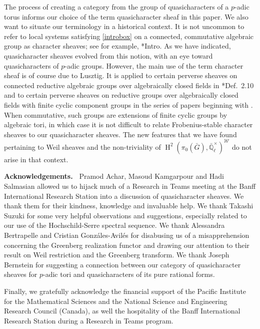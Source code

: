 \documentclass[10pt]{amsart}
\theoremstyle{plain}
\theoremstyle{definition}
\theoremstyle{remark}
\newcommand{\EE}{\mathbb{\bar Q}_\ell}
\newcommand{\EEx}{\EE^\times}
\newcommand{\Weil}[1]{\mathcal{W}_{#1}}
\DeclareMathOperator{\Hh}{H}
\begin{document}
The process of creating a category from the group of quasicharacters of a $p$-adic  torus informs our choice of the term quasicharacter sheaf in this paper.
We also want to situate our terminology in a historical context.
It is not uncommon to refer to local systems satisfying \eqref{introbox} on a connected, commutative algebraic group as character sheaves;
see for example, \cite{kamgarpour:09a}*{Intro}.
As we have indicated, quasicharacter sheaves evolved from this notion,
with an eye toward quasicharacters of $p$-adic groups.
However, the main use of the term character sheaf is of course due to Lusztig.
It is applied to certain perverse sheaves on connected reductive algebraic groups over algebraically closed fields in
\cite{lusztig:85a}*{Def.~2.10} and to certain perverse sheaves on reductive groups
over algebraically closed fields with finite cyclic component groups in the series of papers
beginning with \cite{lusztig:disconnected1}.
When commutative, such groups are extensions of finite cyclic groups by algebraic tori,
in which case it is not difficult to relate Frobenius-stable character sheaves to our quasicharacter sheaves.
The new features that we have found pertaining to Weil sheaves and the non-triviality of $\Hh^2(\pi_0({\bar G}),\EEx)^{\Weil{}}$ do not arise in that context.

\medskip
\noindent\textbf{Acknowledgements.\ } {Pramod Achar, Masoud Kamgarpour and Hadi Salmasian
allowed us to hijack much of a Research in Teams meeting at the Banff International Research Station into a discussion of
quasicharacter sheaves.  We thank them for their kindness, knowledge and invaluable help.
We thank Takashi Suzuki for some very helpful observations and suggestions, especially related to our use of the Hochschild-Serre spectral sequence.
We thank Alessandra Bertrapelle and Cristian Gonz\'ales-Avil\'es for disabusing us of a misapprehension concerning the Greenberg realization functor and drawing our attention to their result on Weil restriction and the Greenberg transform.
We thank Joseph Bernstein for suggesting a connection between our category of quasicharacter sheaves for $p$-adic tori and quasicharacters of its pure rational forms.}

{Finally, we gratefully acknowledge the financial support of the Pacific Institute for the Mathematical Sciences and the National Science and Engineering Research Council (Canada), as well the hospitality of the Banff International Research Station during a Research in Teams program.}
\end{document}
